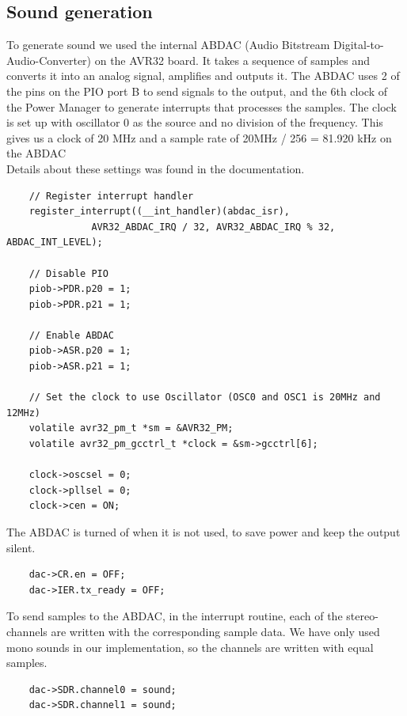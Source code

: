 \subsection{Sound generation}
To generate sound we used the internal ABDAC (Audio Bitstream Digital-to-Audio-Converter)
on the AVR32 board. It takes a sequence of samples and converts it into an analog
signal, amplifies and outputs it.
The ABDAC uses 2 of the pins on the PIO port B to send signals to the output, and the
6th clock of the Power Manager to generate interrupts that processes the samples.
The clock is set up with oscillator 0 as the source and no division of the frequency.
This gives us a clock of 20 MHz and a sample rate of 20MHz / 256 = 81.920 kHz on the ABDAC\\
Details about these settings was found in the documentation\cite{avr32-stk1000}.
\begin{lstlisting}
	// Register interrupt handler
	register_interrupt((__int_handler)(abdac_isr),
			   AVR32_ABDAC_IRQ / 32, AVR32_ABDAC_IRQ % 32, ABDAC_INT_LEVEL);

	// Disable PIO
	piob->PDR.p20 = 1;
	piob->PDR.p21 = 1;

	// Enable ABDAC
	piob->ASR.p20 = 1;
	piob->ASR.p21 = 1;

	// Set the clock to use Oscillator (OSC0 and OSC1 is 20MHz and 12MHz)
	volatile avr32_pm_t *sm = &AVR32_PM;
	volatile avr32_pm_gcctrl_t *clock = &sm->gcctrl[6];

	clock->oscsel = 0;
	clock->pllsel = 0;
	clock->cen = ON;
\end{lstlisting}
The ABDAC is turned of when it is not used, to save power and keep the output silent.\\
\begin{lstlisting}
	dac->CR.en = OFF;
	dac->IER.tx_ready = OFF;
\end{lstlisting}
To send samples to the ABDAC, in the interrupt routine, each of the stereo-channels are written with the corresponding sample data. We have only used mono sounds in our implementation, so the channels are written with equal samples.\\
\begin{lstlisting}
	dac->SDR.channel0 = sound;
	dac->SDR.channel1 = sound;
\end{lstlisting}

